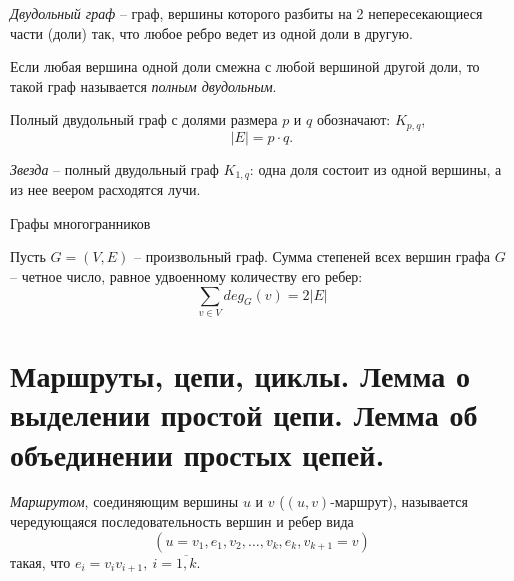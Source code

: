 \begin{example}
    \emph{Двудольный граф} -- граф, вершины которого разбиты на 2 непересекающиеся части (доли) так, что любое ребро ведет из одной доли в другую.

    Если любая вершина одной доли смежна с любой вершиной другой доли, то такой граф называется \emph{полным двудольным}.

    Полный двудольный граф с долями размера $ p $ и $ q $ обозначают: $ K_{p,q} $,
    \[
        | E | = p\cdot q.
    \]
    \begin{figure}[H]
        \centering
        \label{fig:fig_02}
    \end{figure}
\end{example}

\begin{example}
    \emph{Звезда} -- полный двудольный граф $ K_{1,q} $: одна доля состоит из одной вершины, а из нее веером расходятся лучи.
    \begin{figure}[H]
        \centering
        \label{fig:fig_03}
    \end{figure}
\end{example}

\begin{example}
    Графы многогранников
    \begin{figure}[H]
        \centering
        \label{fig:fig_04}
    \end{figure}
\end{example}

\begin{lemma}[О рукопожатиях]
    Пусть $ G=(V,E) $ -- произвольный граф. Сумма степеней всех вершин графа $ G $ -- четное число, равное удвоенному количеству его ребер:
    \begin{equation}\label{eq:1}
        \sum_{v \in V}deg_G(v) = 2 | E |
    \end{equation}
\end{lemma}

\section{Маршруты, цепи, циклы. Лемма о выделении простой цепи. Лемма об объединении простых цепей.}

\begin{definition}[Маршрут]
    \emph{Маршрутом}, соединяющим вершины $ u $ и $ v $ ($ (u,v) $-маршрут), называется чередующаяся последовательность вершин и ребер вида
    \[
        (u = v_1,e_1,v_2,\ldots,v_k,e_k,v_{k+1}=v)
    \]
    такая, что $ e_i = v_iv_{i+1}, \ i = \overline{1,k} $.
\end{definition}

